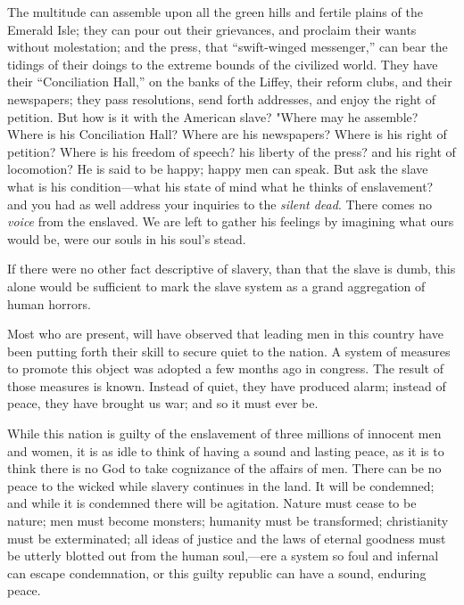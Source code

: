 The multitude can assemble upon all the green hills and fertile plains
of the Emerald Isle; they can pour out their grievances, and proclaim
their wants without molestation; and the press, that ``swift-winged
messenger,'' can bear the tidings of their doings to the extreme bounds
of the civilized world. They have their ``Conciliation Hall,'' on the
banks of the Liffey, their reform clubs, and their newspapers; they pass
resolutions, send forth addresses, and enjoy the right of petition. But
how is it with the American {\protect\hypertarget{434}{}{}}slave? "Where
may he assemble? Where is his Conciliation Hall? Where are his
newspapers? Where is his right of petition? Where is his freedom of
speech? his liberty of the press? and his right of locomotion? He is
said to be happy; happy men can speak. But ask the slave what is his
condition---what his state of mind what he thinks of enslavement? and
you had as well address your inquiries to the \emph{silent dead}. There
comes no \emph{voice} from the enslaved. We are left to gather his
feelings by imagining what ours would be, were our souls in his soul's
stead.

If there were no other fact descriptive of slavery, than that the slave
is dumb, this alone would be sufficient to mark the slave system as a
grand aggregation of human horrors.

Most who are present, will have observed that leading men in this
country have been putting forth their skill to secure quiet to the
nation. A system of measures to promote this object was adopted a few
months ago in congress. The result of those measures is known. Instead
of quiet, they have produced alarm; instead of peace, they have brought
us war; and so it must ever be.

While this nation is guilty of the enslavement of three millions of
innocent men and women, it is as idle to think of having a sound and
lasting peace, as it is to think there is no God to take cognizance of
the affairs of men. There can be no peace to the wicked while slavery
continues in the land. It will be condemned; and while it is condemned
there will be agitation. Nature must cease to be nature; men must become
monsters; humanity must be transformed; christianity must be
exterminated; all ideas of justice and the laws of eternal goodness must
be utterly blotted out from the human soul,---ere a system so foul and
infernal can escape condemnation, or this guilty republic can have a
sound, enduring peace.

{\protect\hypertarget{ux5cux7bux5cux7bux5cux7b1ux5cux7dux5cux7dux5cux7d}{}{}}


